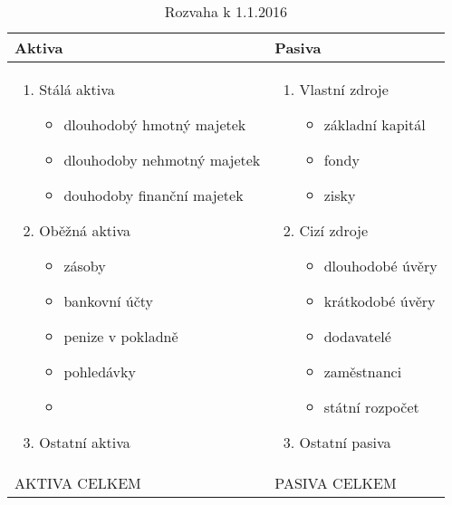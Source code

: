 \begin{table}[h]
    \caption{Rozvaha k 1.1.2016}
    \begin{tabular}{ p{8cm} | p{8cm} }
        Aktiva &
        Pasiva \\ \hline
        \begin{enumerate}
            \item Stálá aktiva
                \begin{itemize}
                    \item dlouhodobý hmotný majetek
                    \item dlouhodoby nehmotný majetek
                    \item douhodoby finanční majetek
                \end{itemize}
            \item Oběžná aktiva
                \begin{itemize}
                    \item zásoby
                    \item bankovní účty
                    \item penize v pokladně
                    \item pohledávky
                    \item []
                \end{itemize}
            \item Ostatní aktiva 
        \end{enumerate} &
        \begin{enumerate}
            \item Vlastní zdroje
                \begin{itemize}
                    \item základní kapitál
                    \item fondy
                    \item zisky
                \end{itemize}
            \item Cizí zdroje
                \begin{itemize}
                    \item dlouhodobé úvěry
                    \item krátkodobé úvěry
                    \item dodavatelé
                    \item zaměstnanci
                    \item státní rozpočet
                \end{itemize}
            \item Ostatní pasiva
        \end{enumerate} \\ \hline
        AKTIVA CELKEM & PASIVA CELKEM \\
    \end{tabular}
\end{table}


